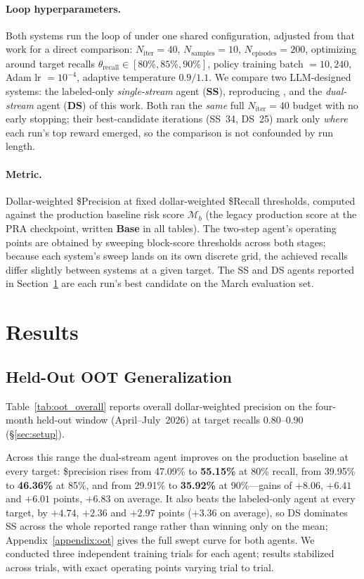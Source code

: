 \documentclass[11pt]{article}
\begin{document}
\paragraph{Loop hyperparameters.}
Both systems run the loop of \citet{qu2025llmenhanced} under one shared configuration, adjusted
from that work for a direct comparison: $N_\text{iter}=40$,
$N_\text{samples}=10$, $N_\text{episodes}=200$, optimizing around target recalls
$\theta_\text{recall}\in[80\%,85\%,90\%]$, policy training batch $=10{,}240$, Adam
lr $=10^{-4}$, adaptive temperature $0.9/1.1$.
We compare two LLM-designed systems: the labeled-only \emph{single-stream} agent (\textbf{SS}),
reproducing \citet{qu2025llmenhanced}, and the \emph{dual-stream} agent (\textbf{DS}) of this
work. Both ran the \emph{same} full $N_\text{iter}=40$ budget with no early stopping; their
best-candidate iterations (SS~34, DS~25) mark only \emph{where} each run's top reward emerged, so
the comparison is not confounded by run length.

\paragraph{Metric.}
Dollar-weighted \$Precision at fixed dollar-weighted \$Recall thresholds, computed against
the production baseline risk score $\mathcal{M}_b$ (the legacy production score at the PRA
checkpoint, written \textbf{Base} in all tables). The two-step agent's operating points are
obtained by sweeping block-score thresholds across both stages; because each system's sweep lands
on its own discrete grid, the achieved recalls differ slightly between systems at a given target.
The SS and DS agents reported in Section~\ref{sec:results} are each run's best candidate on the
March evaluation set.

\section{Results}
\label{sec:results}

\subsection{Held-Out OOT Generalization}
Table~\ref{tab:oot_overall} reports overall dollar-weighted precision on the four-month held-out
window (April--July~2026) at target recalls 0.80--0.90 (\S\ref{sec:setup}).

Across this range the dual-stream agent improves on the production baseline at every target:
\$precision rises from 47.09\% to \textbf{55.15\%} at 80\% recall, from 39.95\% to
\textbf{46.36\%} at 85\%, and from 29.91\% to \textbf{35.92\%} at 90\%---gains of $+8.06$,
$+6.41$ and $+6.01$ points, $+6.83$ on average. It also beats the labeled-only agent at every
target, by $+4.74$, $+2.36$ and $+2.97$ points ($+3.36$ on average), so DS dominates SS across
the whole reported range rather than winning only on the mean; Appendix~\ref{appendix:oot} gives
the full swept curve for both agents. We conducted three independent training trials for each agent; results stabilized across
trials, with exact operating points varying trial to trial.
\end{document}
